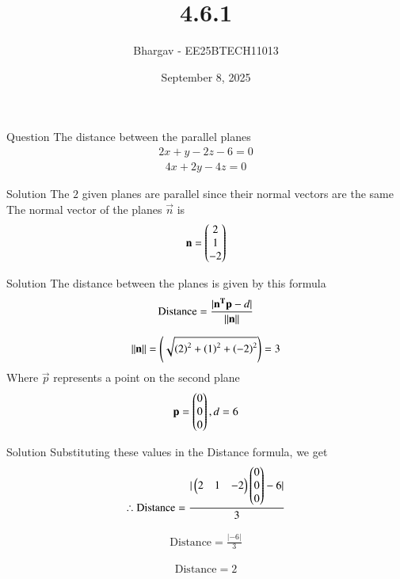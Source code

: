 \documentclass{beamer}
\title{4.6.1}
\date{September 8, 2025}
\author{Bhargav - EE25BTECH11013}
\begin{document}
\frame{\titlepage}

\begin{frame}{Question}
The distance between the parallel planes
\begin{align}
2x + y - 2z - 6 = 0
\end{align}
\begin{align}
4x + 2y - 4z = 0
\end{align}
\end{frame}

\begin{frame}{Solution}
The $2$ given planes are parallel since their normal vectors are the same\\

The normal vector of the planes $\vec{n}$ is
\begin{align}
\mathbf{n} = \begin{pmatrix}2 \\ 1 \\ -2\end{pmatrix}
\end{align}
\end{frame}

\begin{frame}{Solution}
The distance between the planes is given by this formula
\begin{align}
\text{Distance} = \frac{|\mathbf{n^T} \mathbf{p} - d|}{\left\lVert\mathbf{n}\right\rVert}
\end{align}

\begin{align}
{\left\lVert\mathbf{n}\right\rVert} = \left(\sqrt{\left(2\right)^2 + \left(1\right)^2 + \left(-2\right)^2}\right) = 3
\end{align}
Where $\vec{p}$ represents a point on the second plane\\
\begin{align}
\mathbf{p} = \begin{pmatrix}0 \\ 0 \\ 0\end{pmatrix}, d=6 
\end{align}
\end{frame}

\begin{frame}{Solution}
Substituting these values in the Distance formula, we get\\
\begin{align}
\therefore \text{Distance} = \frac{|\begin{pmatrix}2 & 1 & -2\end{pmatrix}\begin{pmatrix}0 \\ 0 \\ 0\end{pmatrix} - 6|}{3}
\end{align}

\begin{align}
\text{Distance} = \frac{|-6|}{3}
\end{align}

\begin{align}
\text{Distance} = 2
\end{align}
\end{frame}
\end{document}
